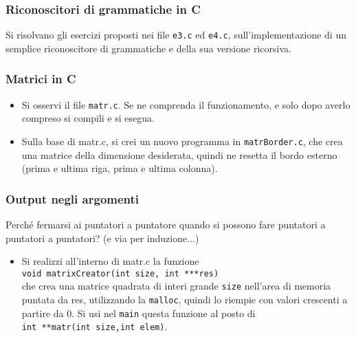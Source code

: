 \documentclass{beamer}
\begin{document}
\begin{frame}
\frametitle{Riconoscitori di grammatiche in C}
Si risolvano gli esercizi proposti nei file \texttt{e3.c} ed \texttt{e4.c}, sull'implementazione di un semplice riconoscitore di grammatiche e della sua versione ricorsiva.
\end{frame}

\begin{frame}
\frametitle{Matrici in C}
\begin{itemize}
 \item Si osservi il file \texttt{matr.c}. Se ne comprenda il funzionamento, e solo dopo averlo compreso si compili e si esegua.
 \item Sulla base di matr.c, si crei un nuovo programma in \texttt{matrBorder.c}, che crea una matrice della dimensione desiderata, quindi ne resetta il bordo esterno (prima e ultima riga, prima e ultima colonna).
\end{itemize}
\end{frame}

\begin{frame}
\frametitle{Output negli argomenti}
Perché fermarsi ai puntatori a puntatore quando si possono fare puntatori a puntatori a puntatori? (e via per induzione...)
\begin{itemize}
 \item Si realizzi all'interno di matr.c la funzione\\ \texttt{void matrixCreator(int size, int ***res)} \\che crea una matrice quadrata di interi grande \texttt{size} nell'area di memoria puntata da res, utilizzando la \texttt{malloc}, quindi lo riempie con valori crescenti a partire da 0. Si usi nel \texttt{main} questa funzione al posto di \\ \texttt{int **matr(int size,int elem)}.
\end{itemize}
\end{frame}
\end{document}
